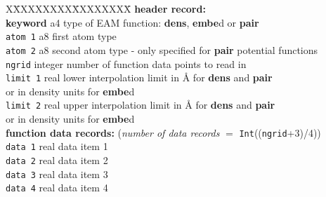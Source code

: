 \begin{tabbing}
X\=XXXXXXXX\=XXXXXXXX\=\kill
{\bf header record:}\\
\> {\bf keyword} \> a4      \> type of EAM function: {\bf dens}, {\bf embe}d or {\bf pair} \\
\> {\tt atom 1}  \> a8      \> first atom type \\
\> {\tt atom 2}  \> a8      \> second atom type - only specified for {\bf pair} potential functions \\
\> {\tt ngrid}   \> integer \> number of function data points to read in \\
\> {\tt limit 1} \> real    \> lower interpolation limit in \AA{} for {\bf dens} and {\bf pair} \\
\>               \>         \> or in density units for {\bf embe}d \\
\> {\tt limit 2} \> real    \> upper interpolation limit in \AA{} for {\bf dens} and {\bf pair} \\
\>               \>         \> or in density units for {\bf embe}d \\
{\bf function data records:} ({\em number of data records} $=$ {\tt Int}(({\tt ngrid}+3)/4)) \\
\> {\tt data 1}  \> real    \> data item 1 \\
\> {\tt data 2}  \> real    \> data item 2 \\
\> {\tt data 3}  \> real    \> data item 3 \\
\> {\tt data 4}  \> real    \> data item 4 \\
\end{tabbing}
